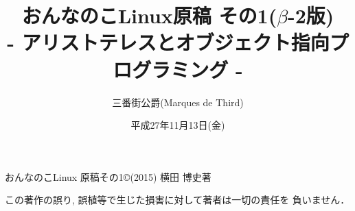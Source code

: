 \documentclass[uplatex,b5j,8pt, twocolumn]{jsarticle}
\title{おんなのこLinux原稿 その1($\beta$-2版)\\
{- アリストテレスとオブジェクト指向プログラミング -}}
\author{三番街公爵(Marques de Third)}
\date{
平成27年11月13日(金)
 }
\begin{document}
\maketitle

おんなのこLinux 原稿その1\copyright (2015) 横田 博史著\par

この著作の誤り, 誤植等で生じた損害に対して著者は一切の責任を
負いません．

\newpage
\setcounter{page}{1}


\end{document}
